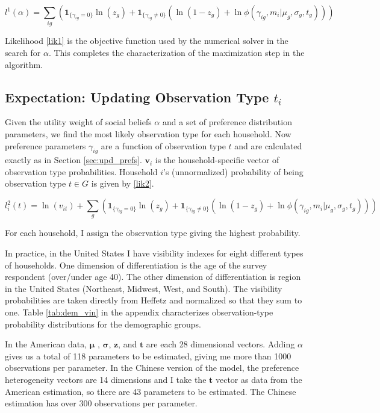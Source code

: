 \begin{equation}
	\label{lik1}
    l^1(\alpha) = \sum_{ig} \left(\mathbf{1}_{\{\gamma_{ig} = 0\}}\ln\left(z_g\right) + \mathbf{1}_{\{\gamma_{ig} \neq 0\}} \left(\ln\left(1 - z_g\right)+\ln \phi(\gamma_{ig},m_i|\mu_g,\sigma_g,t_g)\right)\right)
\end{equation}

Likelihood \eqref{lik1} is the objective function used by the numerical solver in the search for $\alpha$.  This completes the characterization of the maximization step in the algorithm.

\subsection{Expectation: Updating Observation Type $t_i$} 

Given the utility weight of social beliefs $\alpha$ and a set of preference distribution parameters, we find the most likely observation type for each household. Now preference parameters $\gamma_{ig}$ are a function of observation type $t$ and are calculated exactly as in Section \ref{sec:upd_prefs}. $\mathbf{v}_i$ is the household-specific vector of observation type probabilities.  Household $i$'s (unnormalized) probability of being observation type $t \in G$ is given by \eqref{lik2}.

\begin{equation}
    \label{lik2}
    l_i^2(t) = \ln(v_{it}) + \sum_{g} \left(\mathbf{1}_{\{\gamma_{ig} = 0\}}\ln\left(z_g\right) + \mathbf{1}_{\{\gamma_{ig} \neq 0\}} \left(\ln\left(1-z_g\right)+\ln \phi(\gamma_{ig}, m_i|\mu_g,\sigma_g,t_g)\right)\right)
\end{equation}

For each household, I assign the observation type giving the highest probability.

In practice, in the United States I have visibility indexes for eight different types of households.  One dimension of differentiation is the age of the survey respondent (over/under age 40). The other dimension of differentiation is region in the United States (Northeast, Midwest, West, and South).  The visibility probabilities are taken directly from Heffetz and normalized so that they sum to one.  Table \ref{tab:dem_vin} in the appendix characterizes observation-type probability distributions for the demographic groups.


In the American data, $\boldsymbol{\mu}$ , $\boldsymbol{\sigma}$, $\mathbf{z}$, and $\mathbf{t}$ are each 28 dimensional vectors. Adding $\alpha$ gives us a total of 118 parameters to be estimated, giving me more than 1000 observations per parameter.  In the Chinese version of the model, the preference heterogeneity vectors are 14 dimensions and I take the $\mathbf{t}$ vector as data from the American estimation, so there are 43 parameters to be estimated.  The Chinese estimation has over 300 observations per parameter.

